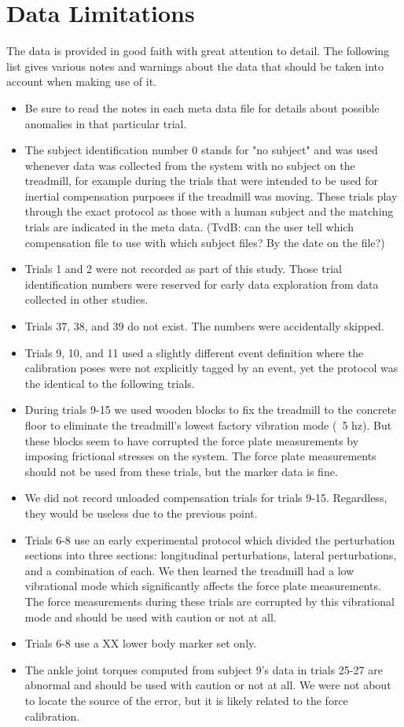 \documentclass[10pt,a4paper,twocolumn]{article}
\begin{document}
\section*{Data Limitations}
%
The data is provided in good faith with great attention to detail. The
following list gives various notes and warnings about the data that should be
taken into account when making use of it.
%
\begin{itemize}
  \item Be sure to read the notes in each meta data file for details about
    possible anomalies in that particular trial.
  \item The subject identification number 0 stands for "no subject" and was
    used whenever data was collected from the system with no subject on the
    treadmill, for example during the trials that were intended to be used for
    inertial compensation purposes if the treadmill was moving. These trials
    play through the exact protocol as those with a human subject and the
    matching trials are indicated in the meta data. (TvdB: can the user tell
    which compensation file to use with which subject files?  By the date on
    the file?)
  \item Trials 1 and 2 were not recorded as part of this study. Those trial
    identification numbers were reserved for early data exploration from data
    collected in other studies.
  \item Trials 37, 38, and 39 do not exist. The numbers were accidentally
    skipped.
  \item Trials 9, 10, and 11 used a slightly different event definition where the
    calibration poses were not explicitly tagged by an event, yet the protocol
    was the identical to the following trials.
  \item During trials 9-15 we used wooden blocks to fix the treadmill to the
    concrete floor to eliminate the treadmill's lowest factory vibration mode
    (~5 hz). But these blocks seem to have corrupted the force plate
    measurements by imposing frictional stresses on the system. The force plate
    measurements should not be used from these trials, but the marker data is
    fine.
  \item We did not record unloaded compensation trials for trials 9-15.
    Regardless, they would be useless due to the previous point.
  \item Trials 6-8 use an early experimental protocol which divided the
    perturbation sections into three sections: longitudinal perturbations,
    lateral perturbations, and a combination of each. We then learned the
    treadmill had a low vibrational mode which significantly affects the force
    plate measurements. The force measurements during these trials are
    corrupted by this vibrational mode and should be used with caution or not
    at all.
  \item Trials 6-8 use a XX lower body marker set only.
  \item The ankle joint torques computed from subject 9's data in trials 25-27
    are abnormal and should be used with caution or not at all. We were not
    about to locate the source of the error, but it is likely related to the
    force calibration.
\end{itemize}
\end{document}
